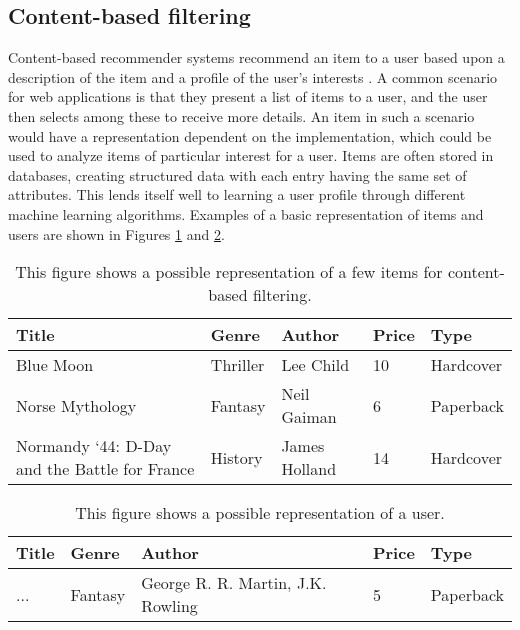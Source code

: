 \subsection{Content-based filtering}\label{content-based-filtering}
Content-based recommender systems recommend an item to a user based upon a description of the item and a profile of the user's interests \cite{ContentBasedFiltering}.
A common scenario for web applications is that they present a list of items to a user, and the user then selects among these to receive more details. 
An item in such a scenario would have a representation dependent on the implementation, which could be used to analyze items of particular interest for a user.
Items are often stored in databases, creating structured data with each entry having the same set of attributes. 
This lends itself well to learning a user profile through different machine learning algorithms.
Examples of a basic representation of items and users are shown in Figures \ref{tbl:content-item} and \ref{tbl:content-user}.
\begin{table}[H]
    \centering
    \begin{tabular}{|l|l|l|l|l|}
    \hline
    Title                                         & Genre    & Author        & Price & Type      \\ \hline
    Blue Moon                                     & Thriller & Lee Child     & 10    & Hardcover \\ \hline
    Norse Mythology                               & Fantasy  & Neil Gaiman   & 6     & Paperback \\ \hline
    Normandy ‘44: D-Day and the Battle for France & History  & James Holland & 14    & Hardcover \\ \hline
    \end{tabular}
    \caption{This figure shows a possible representation of a few items for content-based filtering.}
    \label{tbl:content-item}
\end{table}
\begin{table}[H]
    \centering
    \begin{tabular}{|l|l|l|l|l|}
    \hline
    Title                                         & Genre    & Author        & Price & Type      \\ \hline
    ... & Fantasy  & George R. R. Martin, J.K. Rowling & 5    & Paperback \\\hline
    \end{tabular}
    \caption{This figure shows a possible representation of a user.}
    \label{tbl:content-user}
\end{table}
